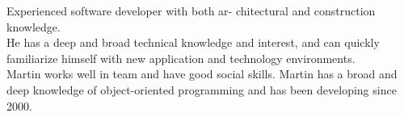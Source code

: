 \documentclass[9pt]{template} %
\begin{document}
\vspace{0.5cm}



\begin{minipage}[t]{0.4\textwidth} %
  \vspace{-\baselineskip} %
  Experienced software developer with both ar- chitectural and construction knowledge.\\

  He has a deep and broad technical knowledge and interest, and can quickly familiarize himself with new application and technology environments.\\

  Martin works well in team and have good social skills. Martin has a broad and deep knowledge of object-oriented programming and has been developing since 2000.
\end{minipage}
\hfill %
\begin{minipage}[t]{0.5\textwidth} %
  \vspace{-\baselineskip} %
  \begin{barchart}{5.0}
  \end{barchart}
\end{minipage}

\begin{center}
\end{center}



\end{document}

